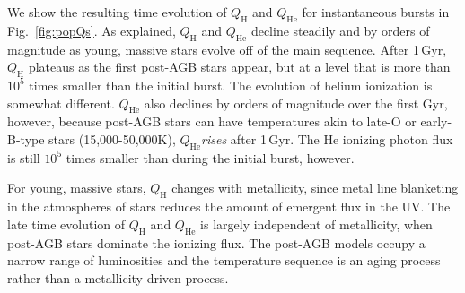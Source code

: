 \documentclass[preprint2]{aastex62}
\newcommand{\QH}{\ensuremath{Q_{\mathrm{H}}}\xspace}
\newcommand{\QHe}{\ensuremath{Q_{\mathrm{He}}}\xspace}
\newcommand{\Gyr}{$\,$Gyr\xspace}
\begin{document}

We show the resulting time evolution of \QH and \QHe for instantaneous bursts in Fig.~\ref{fig:popQs}. As explained, \QH and \QHe decline steadily and by orders of magnitude as young, massive stars evolve off of the main sequence. After 1\Gyr, \QH plateaus as the first post-AGB stars appear, but at a level that is more than $10^5$ times smaller than the initial burst. The evolution of helium ionization is somewhat different. \QHe also declines by orders of magnitude over the first Gyr, however, because post-AGB stars can have temperatures akin to late-O or early-B-type stars (15,000-50,000K), \QHe \emph{rises} after 1\Gyr. The He ionizing photon flux is still $10^5$ times smaller than during the initial burst, however.

For young, massive stars, \QH changes with metallicity, since metal line blanketing in the atmospheres of stars reduces the amount of emergent flux in the UV. The late time evolution of \QH and \QHe is largely independent of metallicity, when post-AGB stars dominate the ionizing flux. The post-AGB models occupy a narrow range of luminosities and the temperature sequence is an aging process rather than a metallicity driven process.
\end{document}
